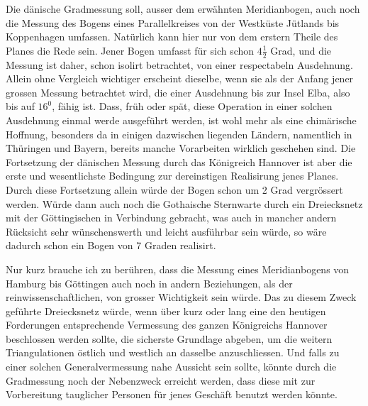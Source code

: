 Die dänische Gradmessung soll, ausser dem erwähnten Meridianbogen, auch noch die Messung des Bogens eines Parallelkreises von der Westküste Jütlands bis Koppenhagen umfassen. Natürlich kann hier nur von dem erstern Theile des Planes die Rede sein. Jener Bogen umfasst für sich schon \(4\frac12\) Grad, und die Messung ist daher, schon isolirt betrachtet, von einer respectabeln Ausdehnung. Allein ohne Vergleich wichtiger erscheint dieselbe, wenn sie als der Anfang jener grossen Messung betrachtet wird, die einer Ausdehnung bis zur Insel Elba, also bis auf \(16^0\), fähig ist. Dass, früh oder spät, diese Operation in einer solchen Ausdehnung einmal werde ausgeführt werden, ist wohl mehr als eine chimärische Hoffnung, besonders da in einigen dazwischen liegenden Ländern, namentlich in Thüringen und Bayern, bereits manche Vorarbeiten wirklich geschehen sind. Die Fortsetzung der dänischen Messung durch das Königreich Hannover ist aber die erste und wesentlichste Bedingung zur dereinstigen Realisirung jenes Planes. Durch diese Fortsetzung allein würde der Bogen schon um 2 Grad vergrössert werden. Würde dann auch noch die Gothaische Sternwarte durch ein Dreiecksnetz mit der Göttingischen in Verbindung gebracht, was auch in mancher andern Rücksicht sehr wünschenswerth und leicht ausführbar sein würde, so wäre dadurch schon ein Bogen von 7 Graden realisirt.

Nur kurz brauche ich zu berühren, dass die Messung eines Meridianbogens von Hamburg bis Göttingen auch noch in andern Beziehungen, als der reinwissenschaftlichen, von grosser Wichtigkeit sein würde. Das zu diesem Zweck geführte Dreiecksnetz würde, wenn über kurz oder lang eine den heutigen Forderungen entsprechende Vermessung des ganzen Königreichs Hannover beschlossen werden sollte, die sicherste Grundlage abgeben, um die weitern Triangulationen östlich und westlich an dasselbe anzuschliessen. Und falls zu einer solchen Generalvermessung nahe Aussicht sein sollte, könnte durch die Gradmessung noch der Nebenzweck erreicht werden, dass diese mit zur Vorbereitung tauglicher Personen für jenes Geschäft benutzt werden könnte.

